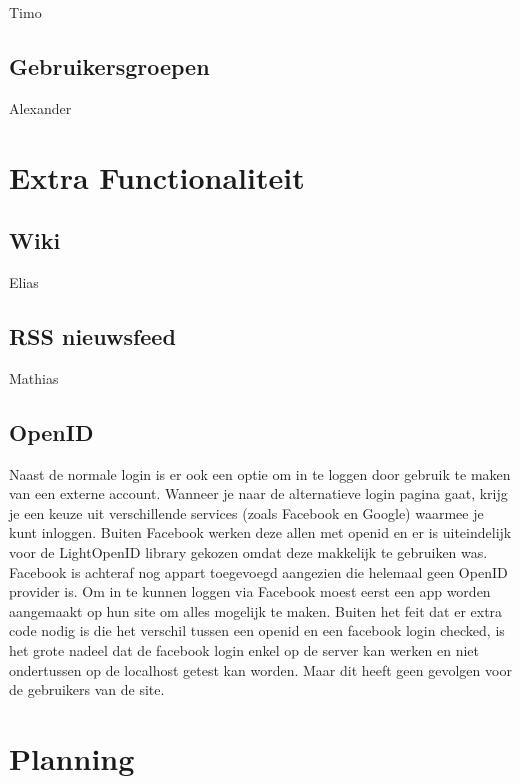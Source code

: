 \documentclass[11pt]{article}
\begin{document}
Timo







\subsection{Gebruikersgroepen}

Alexander



\section{Extra Functionaliteit}


\subsection{Wiki}

Elias



\subsection{RSS nieuwsfeed}

Mathias



\subsection{OpenID}

Naast de normale login is er ook een optie om in te loggen door gebruik te maken van een externe account. Wanneer je naar de alternatieve login pagina gaat, krijg je een keuze uit verschillende services (zoals Facebook en Google) waarmee je kunt inloggen. Buiten Facebook werken deze allen met openid en er is uiteindelijk voor de LightOpenID library gekozen omdat deze makkelijk te gebruiken was. Facebook is achteraf nog appart toegevoegd aangezien die helemaal geen OpenID provider is. Om in te kunnen loggen via Facebook moest eerst een app worden aangemaakt op hun site om alles mogelijk te maken. Buiten het feit dat er extra code nodig is die het verschil tussen een openid en een facebook login checked, is het grote nadeel dat de facebook login enkel op de server kan werken en niet ondertussen op de localhost getest kan worden. Maar dit heeft geen gevolgen voor de gebruikers van de site.




\section{Planning}
\end{document}
